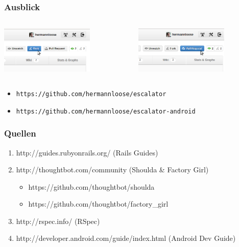 \documentclass[10pt]{beamer}
\begin{document}
\begin{frame}[c]
  \frametitle{Ausblick}
  \begin{columns}
    \begin{column}{0.4\textwidth}
      \includegraphics[width=12em]{fork}
    \end{column}
    \begin{column}{0.4\textwidth}
      \includegraphics[width=12em]{pullrequest}
    \end{column}
  \end{columns}
  \begin{itemize}
    \item \texttt{https://github.com/hermannloose/escalator}
    \item \texttt{https://github.com/hermannloose/escalator-android}
  \end{itemize}
\end{frame}

\begin{frame}[c]
  \frametitle{Quellen}
  \begin{enumerate}
    \item http://guides.rubyonrails.org/ (Rails Guides)
    \item http://thoughtbot.com/community (Shoulda \& Factory Girl)
    \begin{itemize}
      \item https://github.com/thoughtbot/shoulda
      \item https://github.com/thoughtbot/factory\_girl
    \end{itemize}
    \item http://rspec.info/ (RSpec)
    \item http://developer.android.com/guide/index.html (Android Dev Guide)
  \end{enumerate}
\end{frame}
\end{document}
